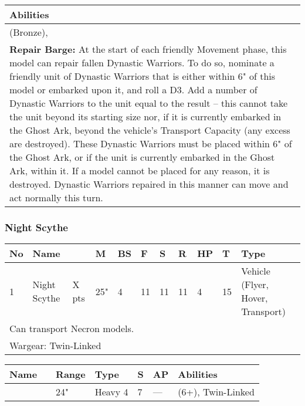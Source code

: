 \noindent
\begin{tabular}{||m{532pt}||}
	\hline
	Abilities \\
	\hline
	\quickref{Awakening Protocols} (Bronze), \quickref{Living Metal}\\
	\textbf{Repair Barge:} At the start of each friendly Movement phase, this model can repair fallen Dynastic Warriors. To do so, nominate a friendly unit of Dynastic Warriors that is either within 6" of this model or embarked upon it, and roll a D3. Add a number of Dynastic Warriors to the unit equal to the result – this cannot take the unit beyond its starting size nor, if it is currently embarked in the Ghost Ark, beyond the vehicle’s Transport Capacity (any excess are destroyed). These Dynastic Warriors must be placed within 6" of the Ghost Ark, or if the unit is currently embarked in the Ghost Ark, within it. If a model cannot be placed for any reason, it is destroyed. Dynastic Warriors repaired in this manner can move and act normally this turn. \\
	\hline
\end{tabular}



\newpage
\subsubsection{Night Scythe}

\noindent
\begin{tabular}{||m{10pt} m{95pt} m{30pt} m{11pt} m{11pt} m{11pt} m{11pt} m{11pt} m{11pt} m{11pt} m{200pt}||}
	\hline
	No & Name & & M & BS & F & S & R & HP & T & Type \\
	\hline
	1 & Night Scythe & X pts & 25" & 4 & 11 & 11 & 11 & 4 & 15 & Vehicle (Flyer, Hover, Transport) \\
	\hline
	\hline
	\multicolumn{11}{||Z{532 pt}||}{Can transport Necron models.}\\		
	\hline
	\hline
	\multicolumn{11}{||Z{532 pt}||}{Wargear: Twin-Linked \quickref{Tesla Destructor}}\\
	\hline
\end{tabular}

\noindent
\begin{tabular}{||m{110pt} m{30pt} m{31pt} m{55pt} m{12pt} m{12pt} m{210pt}||}
	\hline
	Name & & Range & Type & S & AP & Abilities \\
	\hline
	\quickref{Tesla Destructor} & & 24" & Heavy 4 & 7 & — & \quickref{Tesla} (6+), Twin-Linked\\
	\hline
\end{tabular}


